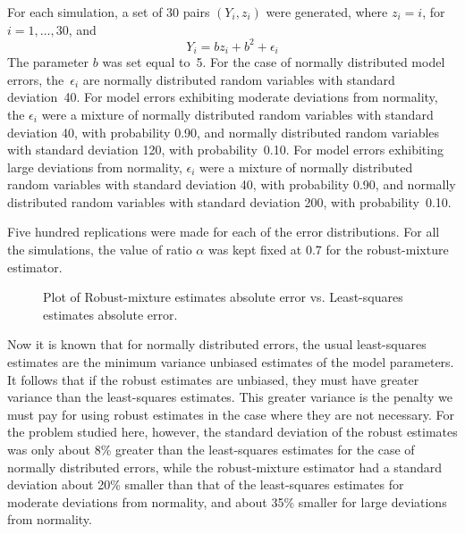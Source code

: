 \documentclass{admbmanual}
\begin{document}
For each simulation, a set of 30 pairs $(Y_i,z_i)$ were generated,
where $z_i=i$, \mbox{for $i=1,\ldots,30$}, and
\begin{equation*}
  Y_i=bz_i+b^2+\epsilon_i
\end{equation*}
The parameter $b$ was set equal to~5.
For the case of normally distributed model errors,
the~$\epsilon_i$ are normally distributed random
variables with standard deviation~40.
For model errors exhibiting moderate deviations from normality, 
the $\epsilon_i$ were a mixture of normally 
distributed random
variables with standard deviation 40, with probability 0.90, and
normally distributed random variables 
with standard deviation 120, with probability~0.10.
For model errors exhibiting large deviations 
from normality, $\epsilon_i$ were a mixture of normally 
distributed random
variables with standard deviation 40, with probability 0.90, and
normally distributed random variables with 
standard deviation 200, with probability~0.10.

Five hundred replications were made for each of the error distributions.
For all the simulations, the value of ratio $\alpha$
was kept fixed at $0.7$ for the robust-mixture estimator. 

\begin{wrapfigure}{r}{.45\textwidth}%
         \centering
        \vspace*{-.75\baselineskip}%
        { \par}%
        \caption{Plot of Robust-mixture estimates absolute error vs. Least-squares estimates absolute error.}%
         \label{fig:monte-carlo-03} 
\end{wrapfigure}

Now it is known that for normally distributed errors,
the usual least-squares estimates are the minimum variance unbiased
estimates of the model parameters. It follows that if the
robust estimates are unbiased, they must have greater variance than
the least-squares estimates. This greater variance is the penalty we must
pay for using robust estimates in the case where they are not necessary.
For the problem studied here, however, the standard deviation of the
robust estimates was only about 8\% greater than the least-squares
estimates for the case of normally distributed errors, while the
robust-mixture estimator had a standard deviation about 20\% smaller
than that of the least-squares estimates for moderate deviations from
normality, and about 35\% smaller for large deviations from normality.
\end{document}
